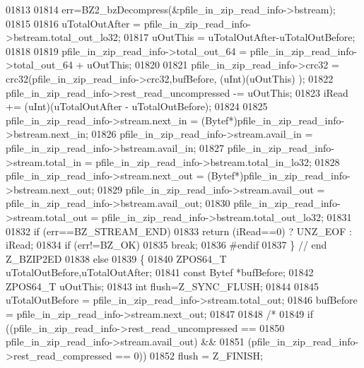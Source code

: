 \begin{DoxyCode}
01813 
01814             err=BZ2\_bzDecompress(&pfile\_in\_zip\_read\_info->bstream);
01815 
01816             uTotalOutAfter = pfile\_in\_zip\_read\_info->bstream.total\_out\_lo32;
01817             uOutThis = uTotalOutAfter-uTotalOutBefore;
01818 
01819             pfile\_in\_zip\_read\_info->total\_out\_64 = pfile\_in\_zip\_read\_info->total\_out\_64 + uOutThis;
01820 
01821             pfile\_in\_zip\_read\_info->crc32 = crc32(pfile\_in\_zip\_read\_info->crc32,bufBefore, (uInt)(uOutThis)
      );
01822             pfile\_in\_zip\_read\_info->rest\_read\_uncompressed -= uOutThis;
01823             iRead += (uInt)(uTotalOutAfter - uTotalOutBefore);
01824 
01825             pfile\_in\_zip\_read\_info->stream.next\_in   = (Bytef*)pfile\_in\_zip\_read\_info->bstream.next\_in;
01826             pfile\_in\_zip\_read\_info->stream.avail\_in  = pfile\_in\_zip\_read\_info->bstream.avail\_in;
01827             pfile\_in\_zip\_read\_info->stream.total\_in  = pfile\_in\_zip\_read\_info->bstream.total\_in\_lo32;
01828             pfile\_in\_zip\_read\_info->stream.next\_out  = (Bytef*)pfile\_in\_zip\_read\_info->bstream.next\_out;
01829             pfile\_in\_zip\_read\_info->stream.avail\_out = pfile\_in\_zip\_read\_info->bstream.avail\_out;
01830             pfile\_in\_zip\_read\_info->stream.total\_out = pfile\_in\_zip\_read\_info->bstream.total\_out\_lo32;
01831 
01832             \textcolor{keywordflow}{if} (err==BZ\_STREAM\_END)
01833               \textcolor{keywordflow}{return} (iRead==0) ? UNZ\_EOF : iRead;
01834             \textcolor{keywordflow}{if} (err!=BZ\_OK)
01835               \textcolor{keywordflow}{break};
01836 \textcolor{preprocessor}{#endif}
01837         \} \textcolor{comment}{// end Z\_BZIP2ED}
01838         \textcolor{keywordflow}{else}
01839         \{
01840             ZPOS64\_T uTotalOutBefore,uTotalOutAfter;
01841             \textcolor{keyword}{const} Bytef *bufBefore;
01842             ZPOS64\_T uOutThis;
01843             \textcolor{keywordtype}{int} flush=Z\_SYNC\_FLUSH;
01844 
01845             uTotalOutBefore = pfile\_in\_zip\_read\_info->stream.total\_out;
01846             bufBefore = pfile\_in\_zip\_read\_info->stream.next\_out;
01847 
01848             \textcolor{comment}{/*}
01849 \textcolor{comment}{            if ((pfile\_in\_zip\_read\_info->rest\_read\_uncompressed ==}
01850 \textcolor{comment}{                     pfile\_in\_zip\_read\_info->stream.avail\_out) &&}
01851 \textcolor{comment}{                (pfile\_in\_zip\_read\_info->rest\_read\_compressed == 0))}
01852 \textcolor{comment}{                flush = Z\_FINISH;}

\end{DoxyCode}
